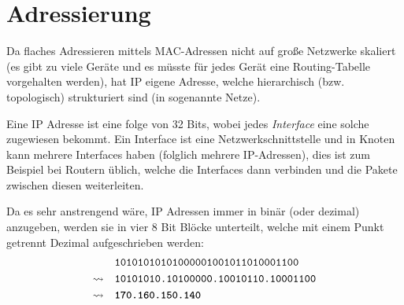 \documentclass[a4paper, 11pt, accentcolor = tud3b]{tudreport}
\begin{document}
        \section{Adressierung}
            Da flaches Adressieren mittels MAC-Adressen nicht auf große Netzwerke skaliert (es gibt zu viele Geräte und es müsste für jedes Gerät eine Routing-Tabelle vorgehalten werden), hat IP eigene Adresse, welche hierarchisch (bzw. topologisch) strukturiert sind (in sogenannte Netze).
            
            Eine IP Adresse ist eine folge von 32 Bits, wobei jedes \textit{Interface} eine solche zugewiesen bekommt. Ein Interface ist eine Netzwerkschnittstelle und in Knoten kann mehrere Interfaces haben (folglich mehrere IP-Adressen), dies ist zum Beispiel bei Routern üblich, welche die Interfaces dann verbinden und die Pakete zwischen diesen weiterleiten.
            
            Da es sehr anstrengend wäre, IP Adressen immer in binär (oder dezimal) anzugeben, werden sie in vier 8 Bit Blöcke unterteilt, welche mit einem Punkt getrennt Dezimal aufgeschrieben werden:
            \begin{align*}
            	                 & \quad\texttt{10101010101000001001011010001100}    \\
            	\rightsquigarrow & \quad\texttt{10101010.10100000.10010110.10001100} \\
            	\rightsquigarrow & \quad\textbf{\texttt{170.160.150.140}}
            \end{align*}
            
\end{document}
